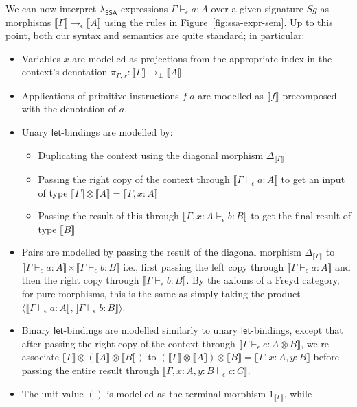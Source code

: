 \documentclass[acmsmall,screen,review]{acmart}
\newcommand{\ms}[1]{\ensuremath{\mathsf{#1}}}
\newcommand{\bhyp}[2]{#1 : #2}
\newcommand{\hasty}[4]{#1 \vdash_{#2} #3: {#4}}
\newcommand{\dnt}[1]{\llbracket{#1}\rrbracket}
\newcommand{\isotopessa}{\(\lambda_{\ms{SSA}}\)}
\begin{document}
We can now interpret \isotopessa{}-expressions $\hasty{\Gamma}{\epsilon}{a}{A}$ over a given
signature $Sg$ as morphisms $\dnt{\Gamma} \to_\epsilon \dnt{A}$ using the rules in
Figure~\ref{fig:ssa-expr-sem}. Up to this point, both our syntax and semantics are quite standard;
in particular:
\begin{itemize}
  \item Variables $x$ are modelled as projections from the appropriate index in the context's
  denotation $\pi_{\Gamma, x} : \dnt{\Gamma} \to_\bot \dnt{A}$
  \item Applications of primitive instructions $f\;a$ are modelled as $\dnt{f}$ precomposed with the
  denotation of $a$. 
  \item Unary \ms{let}-bindings are modelled by:
  \begin{itemize}
    \item Duplicating the context using the diagonal morphism $\Delta_{\dnt{\Gamma}}$
    \item Passing the right copy of the context through $\dnt{\hasty{\Gamma}{\epsilon}{a}{A}}$ to
    get an input of type $\dnt{\Gamma} \otimes \dnt{A} = \dnt{\Gamma, \bhyp{x}{A}}$
    \item Passing the result of this through $\dnt{\hasty{\Gamma, \bhyp{x}{A}}{\epsilon}{b}{B}}$ to get
    the final result of type $\dnt{B}$
  \end{itemize}
  \item Pairs are modelled by passing the result of the diagonal morphism $\Delta_{\dnt{\Gamma}}$ to
   $
   \dnt{\hasty{\Gamma}{\epsilon}{a}{A}} \ltimes \dnt{\hasty{\Gamma}{\epsilon}{b}{B}}
   $
   i.e., first
   passing the left copy through $\dnt{\hasty{\Gamma}{\epsilon}{a}{A}}$ and then the right copy
   through $\dnt{\hasty{\Gamma}{\epsilon}{b}{B}}$. By the axioms of a Freyd category, for pure
   morphisms, this is the same as simply taking the product
   $
    \langle \dnt{\hasty{\Gamma}{\epsilon}{a}{A}}, \dnt{\hasty{\Gamma}{\epsilon}{b}{B}} \rangle
   $.
  \item Binary \ms{let}-bindings are modelled similarly to unary \ms{let}-bindings, except that after
  passing the right copy of the context through $\dnt{\hasty{\Gamma}{\epsilon}{e}{A \otimes B}}$, we
  re-associate $\dnt{\Gamma} \otimes (\dnt{A} \otimes \dnt{B})$ to $(\dnt{\Gamma} \otimes \dnt{A})
  \otimes \dnt{B} = \dnt{\Gamma, \bhyp{x}{A}, \bhyp{y}{B}}$ before passing the entire result through
  $\dnt{\hasty{\Gamma, \bhyp{x}{A}, \bhyp{y}{B}}{\epsilon}{c}{C}}$.
  \item The unit value $()$ is modelled as the terminal morphism $1_{\dnt{\Gamma}}$, while

\end{itemize}
\end{document}
